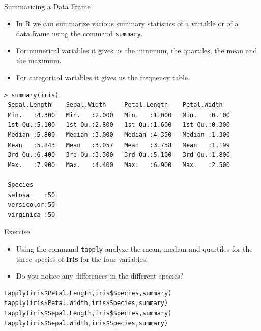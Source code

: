 \documentclass[handout]{beamer}
\begin{document}
\begin{frame}[fragile]{Summarizing a Data Frame}
\scriptsize{
\begin{itemize}
 \item In R we can summarize various summary statistics of a variable or of a data.frame using the command \verb+summary+.
 \item For numerical variables it gives us the minimum, the quartiles, the mean and the maximum.  
 \item For categorical variables it gives us the frequency table.
\end{itemize}


\begin{verbatim}
> summary(iris)
 Sepal.Length    Sepal.Width     Petal.Length    Petal.Width   
 Min.   :4.300   Min.   :2.000   Min.   :1.000   Min.   :0.100  
 1st Qu.:5.100   1st Qu.:2.800   1st Qu.:1.600   1st Qu.:0.300  
 Median :5.800   Median :3.000   Median :4.350   Median :1.300  
 Mean   :5.843   Mean   :3.057   Mean   :3.758   Mean   :1.199  
 3rd Qu.:6.400   3rd Qu.:3.300   3rd Qu.:5.100   3rd Qu.:1.800  
 Max.   :7.900   Max.   :4.400   Max.   :6.900   Max.   :2.500  

 Species  
 setosa    :50  
 versicolor:50  
 virginica :50   
\end{verbatim}

 
} 
\end{frame}


\begin{frame}[fragile]{Exercise}
\scriptsize{
\begin{itemize}
\item Using the command \verb+tapply+ analyze the mean, median and quartiles for the three species of \textbf{Iris} for the four variables.
 \item Do you notice any differences in the different species?
\end{itemize}


\begin{verbatim}
tapply(iris$Petal.Length,iris$Species,summary)
tapply(iris$Petal.Width,iris$Species,summary)
tapply(iris$Sepal.Length,iris$Species,summary)
tapply(iris$Sepal.Width,iris$Species,summary) 
\end{verbatim}


} 
\end{frame}
\end{document}
